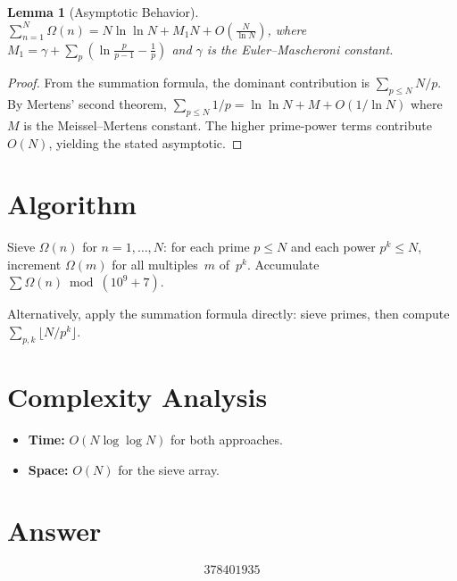 \documentclass[11pt]{article}
\newtheorem{lemma}[theorem]{Lemma}
\theoremstyle{definition}
\begin{document}
\begin{lemma}[Asymptotic Behavior]
$\displaystyle\sum_{n=1}^{N} \Omega(n) = N \ln\ln N + M_1 N + O\!\left(\frac{N}{\ln N}\right)$, where $M_1 = \gamma + \sum_{p}\!\left(\ln\frac{p}{p-1} - \frac{1}{p}\right)$ and $\gamma$ is the Euler--Mascheroni constant.
\end{lemma}

\begin{proof}
From the summation formula, the dominant contribution is $\sum_{p \leq N} N/p$. By Mertens' second theorem, $\sum_{p \leq N} 1/p = \ln\ln N + M + O(1/\ln N)$ where $M$ is the Meissel--Mertens constant. The higher prime-power terms contribute $O(N)$, yielding the stated asymptotic.
\end{proof}

\section{Algorithm}

Sieve $\Omega(n)$ for $n = 1, \ldots, N$: for each prime $p \leq N$ and each power $p^k \leq N$, increment $\Omega(m)$ for all multiples~$m$ of~$p^k$. Accumulate $\sum \Omega(n) \bmod (10^9+7)$.

Alternatively, apply the summation formula directly: sieve primes, then compute $\sum_{p,k} \lfloor N/p^k \rfloor$.

\section{Complexity Analysis}

\begin{itemize}
    \item \textbf{Time:} $O(N \log\log N)$ for both approaches.
    \item \textbf{Space:} $O(N)$ for the sieve array.
\end{itemize}

\section{Answer}

\[
\boxed{378401935}
\]
\end{document}
